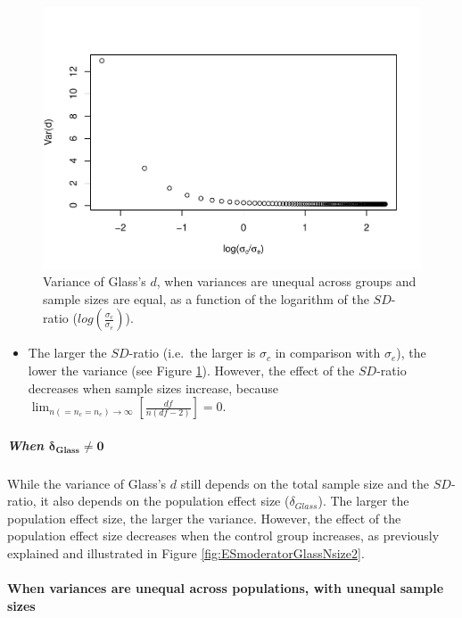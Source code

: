 \documentclass[
  english,
  man,mask]{apa6}
\providecommand{\tightlist}{%
  \setlength{\itemsep}{0pt}\setlength{\parskip}{0pt}}
\let\oldparagraph\paragraph
\renewcommand{\paragraph}[1]{\oldparagraph{#1}\mbox{}}
\let\oldsubparagraph\subparagraph
\renewcommand{\subparagraph}[1]{\oldsubparagraph{#1}\mbox{}}
\begin{document}
\begin{figure}
\centering
\includegraphics{SupMat1_files/figure-latex/varglasshetbalSDratio2-1.pdf}
\caption{\label{fig:varglasshetbalSDratio2}Variance of Glass's \(d\), when variances are unequal across groups and sample sizes are equal, as a function of the logarithm of the \(SD\)-ratio (\(log \left( \frac{\sigma_c}{\sigma_e} \right)\)).}
\end{figure}

\begin{itemize}
\tightlist
\item
  The larger the \(SD\)-ratio (i.e.~the larger is \(\sigma_c\) in comparison with \(\sigma_e\)), the lower the variance (see Figure \ref{fig:varglasshetbalSDratio2}). However, the effect of the \(SD\)-ratio decreases when sample sizes increase, because \(\lim_{n(=n_c=n_e)\rightarrow \infty}\left[\frac{df}{n(df-2)} \right]=0\).
\end{itemize}

\hypertarget{when-bmdelta_glass-neq-0-1}{%
\subparagraph{\texorpdfstring{When \(\bm{\delta_{Glass} \neq 0}\)}{When \textbackslash bm\{\textbackslash delta\_\{Glass\} \textbackslash neq 0\}}}\label{when-bmdelta_glass-neq-0-1}}

While the variance of Glass's \(d\) still depends on the total sample size and the \(SD\)-ratio, it also depends on the population effect size (\(\delta_{Glass}\)). The larger the population effect size, the larger the variance. However, the effect of the population effect size decreases when the control group increases, as previously explained and illustrated in Figure \ref{fig:ESmoderatorGlassNsize2}.

\hypertarget{when-variances-are-unequal-across-populations-with-unequal-sample-sizes-2}{%
\paragraph{When variances are unequal across populations, with unequal sample sizes}\label{when-variances-are-unequal-across-populations-with-unequal-sample-sizes-2}}
\end{document}
